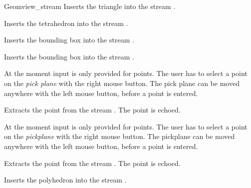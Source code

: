 \begin{ccClass}{Geomview_stream}
{Inserts the triangle  into the stream \ccVar.}


{Inserts the tetrahedron  into the stream \ccVar.}


{Inserts the bounding box  into the stream \ccVar.}

{Inserts the bounding box  into the stream \ccVar.}



At the moment input is only provided for points. The user has to select
a point on the {\it pick plane} with the right mouse button. The pick plane
can be moved anywhere with the left mouse button, before a point is entered.

{Extracts the point  from the stream \ccVar. The point is
 echoed.}



At the moment input is only provided for points. The user has to select
a point on the {\it pickplane} with the right mouse button. The pickplane
can be moved anywhere with the left mouse button, before a point is entered.

{Extracts the point  from the stream \ccVar. The point is
 echoed.}



{Inserts the polyhedron  into the stream \ccVar.}


\end{ccClass}
